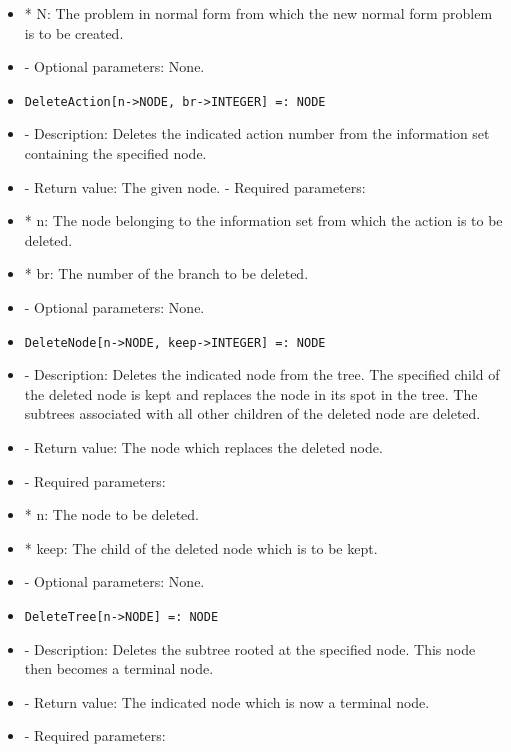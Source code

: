 \begin{itemize}
\bd
\item
*  N:  The problem in normal form from which the new normal form
problem is to be created.
\ed

\item  
- Optional parameters:  None.
\ed

\item
\begin{verbatim}
DeleteAction[n->NODE, br->INTEGER] =: NODE
\end{verbatim}

\bd
\item
- Description:  Deletes the indicated action number from the information
set containing the specified node.
\item
- Return value:  The given node.
- Required parameters:
	
\bd
\item
*  n:  The node belonging to the information set from which the action
is to be deleted.
\item *  br:  The number of the branch to be deleted.
\ed

\item
- Optional parameters:  None.
\ed

\item
\begin{verbatim}
DeleteNode[n->NODE, keep->INTEGER] =: NODE
\end{verbatim}

\bd
\item   
- Description:  Deletes the indicated node from the tree.  The specified
child of the deleted node is kept and replaces the node in its spot in
the tree.  The subtrees associated with all other children of the
deleted node are deleted.
\item
- Return value:  The node which replaces the deleted node.
\item
- Required parameters:
	
\bd
\item
*  n:  The node to be deleted.
\item
*  keep:  The child of the deleted node which is to be kept.
\ed

\item
- Optional parameters:  None.
\ed

\item
\begin{verbatim}
DeleteTree[n->NODE] =: NODE
\end{verbatim}

\bd
\item
- Description:  Deletes the subtree rooted at the specified node.
This node then becomes a terminal node.
\item
- Return value:  The indicated node which is now a terminal node.
\item
- Required parameters:


\end{itemize}
